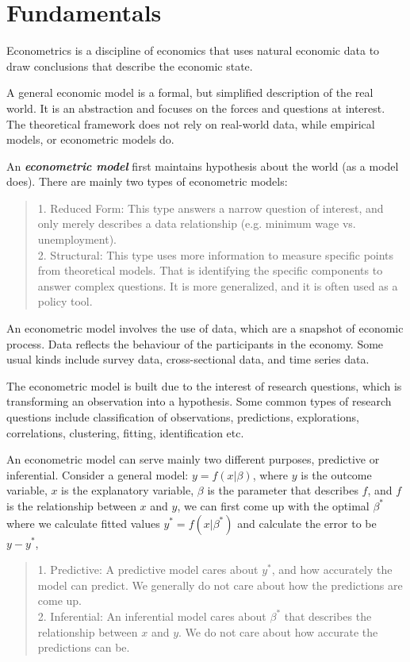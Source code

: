 \section{Fundamentals}
Econometrics is a discipline of economics that uses natural economic data to draw conclusions that describe the economic state.

A general economic model is a formal, but simplified description of the real world. It is an abstraction and focuses on the forces and questions at interest. The theoretical framework does not rely on real-world data, while empirical models, or econometric models do.

An \textbf{\textit{econometric model}} first maintains hypothesis about the world (as a model does). There are mainly two types of econometric models:
\begin{quote}
    1. Reduced Form: This type answers a narrow question of interest, and only merely describes a data relationship (e.g. minimum wage vs. unemployment). \\
    2. Structural: This type uses more information to measure specific points from theoretical models. That is identifying the specific components to answer complex questions. It is more generalized, and it is often used as a policy tool.
\end{quote}

An econometric model involves the use of data, which are a snapshot of economic process. Data reflects the behaviour of the participants in the economy. Some usual kinds include survey data, cross-sectional data, and time series data.

The econometric model is built due to the interest of research questions, which is transforming an observation into a hypothesis. Some common types of research questions include classification of observations, predictions, explorations, correlations, clustering, fitting, identification etc.

An econometric model can serve mainly two different purposes, predictive or inferential. Consider a general model: $y = f(x | \beta)$, where $y$ is the outcome variable, $x$ is the explanatory variable, $\beta$ is the parameter that describes $f$, and $f$ is the relationship between $x$ and $y$, we can first come up with the optimal $\beta^{*}$ where we calculate fitted values $y^{*} = f(x|\beta^{*})$ and calculate the error to be $y - y^{*}$,
\begin{quote}
    1. Predictive: A predictive model cares about $y^{*}$, and how accurately the model can predict. We generally do not care about how the predictions are come up. \\
    2. Inferential: An inferential model cares about $\beta^{*}$ that describes the relationship between $x$ and $y$. We do not care about how accurate the predictions can be.
\end{quote}

